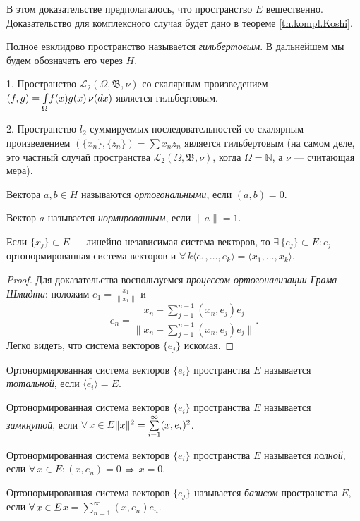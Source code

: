\documentclass[10pt,titlepage, a4paper]{article}
\begin{document}
\begin{zam}
В этом доказательстве предполагалось, что пространство $E$
вещественно. Доказательство для комплексного случая будет дано в
теореме \ref{th.kompl.Koshi}.
\end{zam}

\begin{defen}
Полное евклидово пространство называется \emph{гильбертовым}. В
дальнейшем мы будем обозначать его через $H$.
\end{defen}

\prim

1. Пространство $\mathcal{L}_2(\Omega,\mathfrak{B},\nu)$ со
скалярным произведением
$(f,g)\p=\int\limits_\Omega\!f(x)g(x)\,\nu(dx)$ является
гильбертовым.

2. Пространство $l_2$ суммируемых последовательностей со скалярным
произведением $(\{x_n\},\{z_n\})=\sum x_nz_n$ является гильбертовым
(на самом деле, это частный случай пространства
$\mathcal{L}_2(\Omega,\mathfrak{B},\nu)$, когда $\Omega=\mathbb{N}$,
а $\nu$ --- считающая мера).

\begin{defen}
Вектора $a,b\in H$ называются \emph{ортогональными}, если $(a,b)=0$.

Вектор $a$ называется \emph{нормированным}, если $\|a\|=1$.
\end{defen}

\begin{predl}
Если $\{x_j\}\subset E$ --- линейно независимая система векторов, то
$\exists\,\{e_j\}\subset E:{e_j}$ --- ортонормированная система
векторов и $\forall\,k$\;\;$\langle e_1,\ldots,e_k\rangle=\langle
x_1,\ldots,x_k\rangle$.
\end{predl}

\begin{proof}
Для доказательства воспользуемся \emph{процессом ортогонализации
Грама--Шмидта}: положим $e_1=\frac{x_1}{\|x_1\|}$ и
$$e_n=\frac{x_n-\sum\limits_{j=1}^{n-1}
(x_n,e_j)e_j}{\Big\|x_n-\sum\limits_{j=1}^{n-1}
(x_n,e_j)e_j\Big\|}.$$ Легко видеть, что система векторов $\{e_j\}$
искомая.
\end{proof}

\begin{defen}
Ортонормированная система векторов $\{e_i\}$ простра\-нства $E$
называется \emph{тотальной}, если $\overline{\langle e_i\rangle}=E$.

Ортонормированная система векторов $\{e_i\}$ пространства $E$
называется \emph{замкнутой}, если $\forall\,x\in
E$\;\;$\|x\|^2\p=\sum\limits_{i=1}^\infty (x,e_i)^2$.

Ортонормированная система векторов $\{e_i\}$ пространства $E$
называется \emph{полной}, если $\forall\,x\in E: (x,e_n)=0$
$\p\Rightarrow$ $x=0$.

Ортонормированная система векторов $\{e_j\}$ называется
\emph{базисом} пространства $E$, если $\forall\,x\p\in
E$\;\;$x=\sum\limits_{n=1}^\infty (x,e_n)e_n$.
\end{defen}
\end{document}
